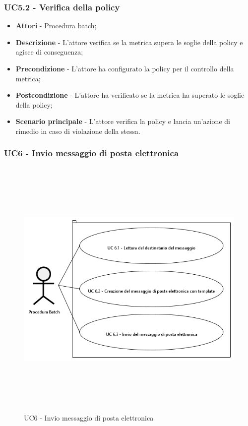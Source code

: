                 \subsubsection{UC5.2 - Verifica della policy}

                    \begin{itemize}

                        \item \textbf{Attori} - Procedura batch;
                        \item \textbf{Descrizione} - L'attore verifica se la metrica supera le soglie della policy e agisce di
                        conseguenza;
                        \item \textbf{Precondizione} - L'attore ha configurato la policy per il controllo della metrica;
                        \item \textbf{Postcondizione} - L'attore ha verificato se la metrica ha superato le soglie della policy;
                        \item \textbf{Scenario principale} - L'attore verifica la policy e lancia un'azione di rimedio in caso di violazione
                        della stessa.

                    \end{itemize}

\newpage

            \subsubsection{UC6 - Invio messaggio di posta elettronica}

                \begin{figure}[H]
                    \centering
                    \includegraphics[width=13cm,height=13cm,keepaspectratio]{./images/UC6.png}
                    \caption{UC6 - Invio messaggio di posta elettronica}
                \end{figure}

